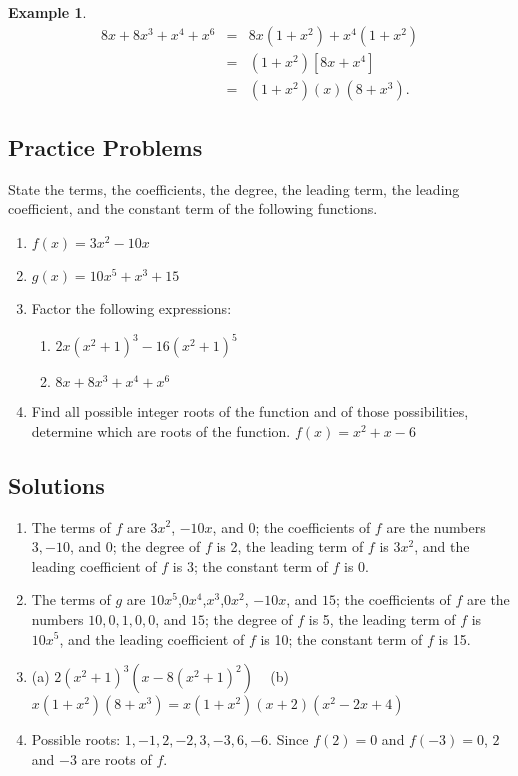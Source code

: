 \documentclass[11pt]{book}               %
\newtheorem{example}{Example}
\begin{document}
\begin{example}
    $$
    \begin{array}{rcl}
    8x+8x^3+x^4+x^6 &=& 8x(1+x^2)+x^4(1+x^2)\\
                    &=& (1+x^2)[8x+x^4]\\
                    &=& (1+x^2)(x)(8+x^3).
    \end{array}
    $$
    
\end{example}

\subsection{Practice Problems}
State the terms, the coefficients, the degree, the leading term, the leading coefficient, and the constant term of the following functions.
\begin{enumerate}
\item $f(x)=3x^2-10x$
\item $g(x)=10x^5+x^3+15$
\item Factor the following expressions:
\begin{enumerate}
\item $ 2x(x^2+1)^3-16(x^2+1)^5 $ 
\item $ 8x+8x^3+x^4+x^6 $ 
\end{enumerate}
\item Find all possible integer roots of the function and of those possibilities, determine which are roots of the function.
 $f(x)=x^2+x-6$ 
\end{enumerate}

\subsection{Solutions} 
\begin{enumerate}
\item The terms of $f$ are $3x^2$, $-10x$, and $0$;
 the coefficients of $f$ are the numbers $3, -10$, and $0$;
 the degree of $f$ is 2, the leading term of $f$ is $3x^2$,  and the leading coefficient of $f$ is 3;
the constant term of $f$ is 0. \\
\item The terms of $g$ are $10x^5$,$0x^4$,$x^3$,$0x^2$, $-10x$, and $15$;
 the coefficients of $f$ are the numbers $10,0,1,0,0$, and $15$;
 the degree of $f$ is 5, the leading term of $f$ is $10x^5$,  and the leading coefficient of $f$ is 10;
the constant term of $f$ is 15.\\
\item (a) $2(x^2+1)^3(x-8(x^2+1)^2)$ \  \quad
    (b) $ x(1+x^2)(8+x^3) = x(1+x^2)(x+2)(x^2-2x+4)$ \ \quad
\item Possible roots: $1, -1,2,-2,3,-3,6,-6$. Since $f(2)=0$ and $f(-3)=0$, $2$ and $-3$ are roots of $f$.
\end{enumerate}
\end{document}
